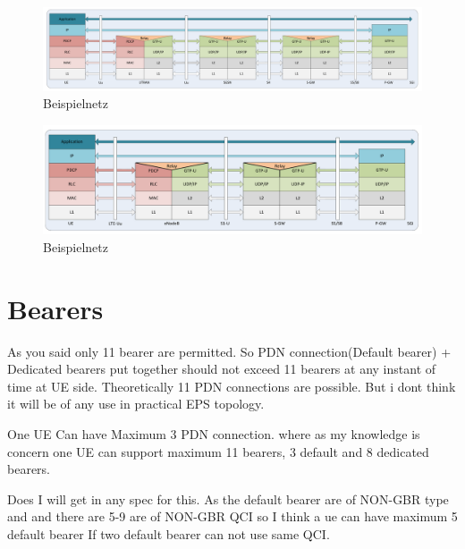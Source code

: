 \begin{figure}[htbp]
 \centering
 \includegraphics[width=1.0\textwidth]{images/3gpp/3g-userplane.pdf}
 \caption{Beispielnetz}\label{fig:3gpp-umtsuserplane}
\end{figure}

\begin{figure}[htbp]
 \centering
 \includegraphics[width=1.0\textwidth]{images/3gpp/LTE-userplane.pdf}
 \caption{Beispielnetz}\label{fig:3gpp-lteuserplane}
\end{figure}


\section{Bearers}

As you said only 11 bearer are permitted.
So PDN connection(Default bearer) + Dedicated bearers put together should not exceed 11 bearers at any instant of time at UE side.
Theoretically 11 PDN connections are possible. But i dont think it will be of any use in practical EPS topology.

One UE Can have Maximum 3 PDN connection.
where as my knowledge is concern one UE can support maximum 11 bearers, 3 default and 8 dedicated bearers.

Does I will get in any spec for this. As the default bearer are of  NON-GBR type and and there are 5-9 are of NON-GBR QCI so I think a ue can have maximum 5 default bearer If two default bearer can not use same QCI.

